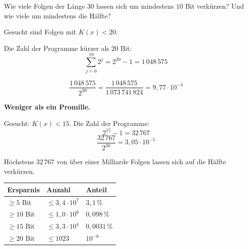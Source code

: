 \begin{aufgabe}
Wie viele Folgen der Länge $30$ lassen sich um mindestens $10$ Bit verkürzen? Und wie viele um mindestens die Hälfte?

\loesung
{}
Gesucht sind Folgen mit $K(x) < 20$.

Die Zahl der Programme kürzer als $20$ Bit:
\[ \sum_{j=0}^{19} 2^{j} = 2^{20}-1 = 1\,048\,575 \]

\[ \frac{1\,048\,575}{2^{30}} = \frac{1\,048\,575}{1\,073\,741\,824} = 9{,}77\cdot10^{-4} \]

\begin{center}
\begin{minipage}{0.9\textwidth}
\textbf{Weniger als ein Promille.}
\end{minipage}
\end{center}

Gesucht: $K(x) < 15$. Die Zahl der Programme:
\[ 2^{15}-1 = 32\,767 \]
\[ \frac{32\,767}{2^{30}} = 3{,}05\cdot10^{-5} \]

Höchstens $32\,767$ von über einer Milliarde Folgen lassen sich auf die Hälfte verkürzen.

\begin{center}
{\small
\renewcommand{\arraystretch}{1.48}
\begin{tabular}{@{}P{2.4cm}P{2.4cm}P{2.6cm}@{}}
\toprule
\textbf{Ersparnis} & \textbf{Anzahl} & \textbf{Anteil}\\
\midrule
$\ge 5$ Bit & $\le 3{,}4\cdot10^{7}$ & $3{,}1\,\%$\\
$\ge 10$ Bit & $\le 1{,}0\cdot10^{6}$ & $0{,}098\,\%$\\
$\ge 15$ Bit & $\le 3{,}3\cdot10^{4}$ & $0{,}0031\,\%$\\
$\ge 20$ Bit & $\le 1023$ & $10^{-6}$\\
\bottomrule
\end{tabular}}
\end{center}

\begin{center}
\begin{minipage}{0.88\textwidth}
\end{minipage}
\end{center}


\end{aufgabe}
